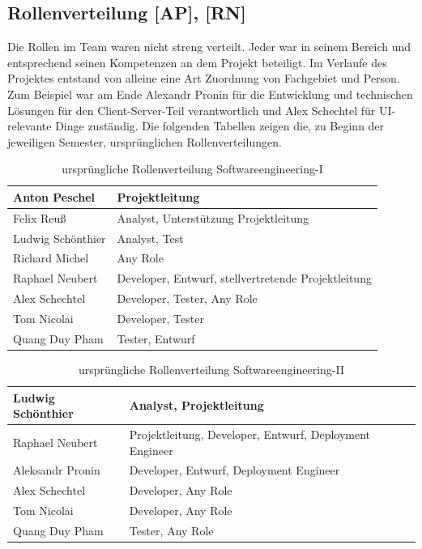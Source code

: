 \documentclass[10pt]{article}
\begin{document}
\subsection{Rollenverteilung [AP], [RN]}
    Die Rollen im Team waren nicht streng verteilt. Jeder war in seinem Bereich und entsprechend seinen Kompetenzen an 
    dem Projekt beteiligt. Im Verlaufe des Projektes entstand von alleine eine Art Zuordnung von Fachgebiet und Person.
    Zum Beispiel war am Ende Alexandr Pronin für die Entwicklung und technischen Lösungen für den Client-Server-Teil verantwortlich 
    und Alex Schechtel für UI-relevante Dinge zuständig. Die folgenden Tabellen zeigen die, zu Beginn der jeweiligen Semester,
    ursprünglichen Rollenverteilungen.
\begin{table}[H]
    \begin{tabular}{|l|l|}
    \hline
    Anton  Peschel    & Projektleitung                                      \\ \hline
    Felix Reuß        & Analyst, Unterstützung Projektleitung               \\ \hline
    Ludwig Schönthier & Analyst,  Test                                      \\ \hline
    Richard Michel    & Any Role                                            \\ \hline
    Raphael Neubert   & Developer, Entwurf, stellvertretende Projektleitung \\ \hline
    Alex Schechtel    & Developer, Tester, Any Role                         \\ \hline
    Tom Nicolai       & Developer, Tester                                   \\ \hline
    Quang Duy Pham    & Tester, Entwurf                                     \\ \hline
    \end{tabular}
    \centering
    \caption{ursprüngliche Rollenverteilung Softwareengineering-I}
\end{table}
\begin{table}[H]
    \begin{tabular}{|l|l|}
    \hline
    Ludwig Schönthier & Analyst,  Projektleitung                                \\ \hline
    Raphael Neubert   & Projektleitung, Developer, Entwurf, Deployment Engineer \\ \hline
    Aleksandr Pronin  & Developer, Entwurf, Deployment Engineer                 \\ \hline
    Alex Schechtel    & Developer,  Any Role                                    \\ \hline
    Tom Nicolai       & Developer, Any Role                                     \\ \hline
    Quang Duy Pham    & Tester, Any Role                                        \\ \hline
    \end{tabular}
    \centering
    \caption{ursprüngliche Rollenverteilung Softwareengineering-II}
\end{table}
\end{document}
